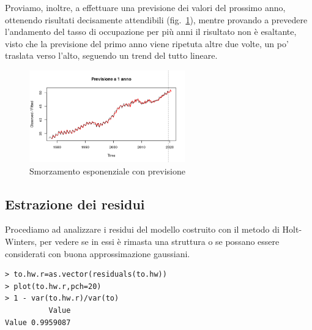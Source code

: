 \documentclass[11pt,a4paper,oneside]{article}
\begin{document}
Proviamo, inoltre, a effettuare una previsione dei valori del prossimo anno, ottenendo risultati decisamente attendibili (fig.~\ref{fig:hwPrevisioni}), mentre provando a prevedere l'andamento del tasso di occupazione per più anni il risultato non è esaltante, visto che la previsione del primo anno viene ripetuta altre due volte, un po’ traslata verso l'alto, seguendo un trend del tutto lineare. 
\begin{figure}[h]
\centering
\includegraphics[width=0.6\textwidth]{images/hwPrevisioni}
\caption{Smorzamento esponenziale con previsione}
\label{fig:hwPrevisioni}
\end{figure}

\subsection{Estrazione dei residui}
Procediamo ad analizzare i residui del modello costruito con il metodo di Holt-Winters, per vedere se in essi è rimasta una struttura o se possano essere considerati con buona approssimazione gaussiani.
\begin{verbatim}
> to.hw.r=as.vector(residuals(to.hw))
> plot(to.hw.r,pch=20)
> 1 - var(to.hw.r)/var(to)
          Value
Value 0.9959087
\end{verbatim}
\end{document}
